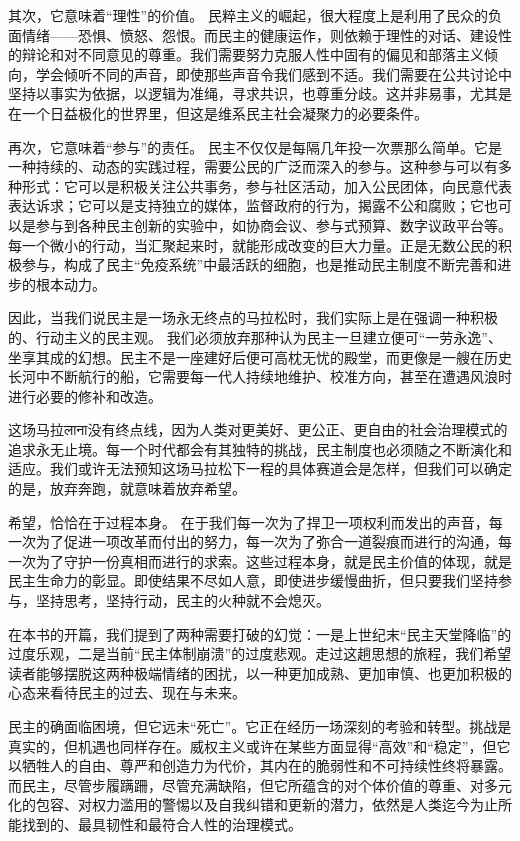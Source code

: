 \documentclass[UTF8, 10pt]{ctexbook}
\begin{document}
其次，它意味着“理性”的价值。 民粹主义的崛起，很大程度上是利用了民众的负面情绪——恐惧、愤怒、怨恨。而民主的健康运作，则依赖于理性的对话、建设性的辩论和对不同意见的尊重。我们需要努力克服人性中固有的偏见和部落主义倾向，学会倾听不同的声音，即使那些声音令我们感到不适。我们需要在公共讨论中坚持以事实为依据，以逻辑为准绳，寻求共识，也尊重分歧。这并非易事，尤其是在一个日益极化的世界里，但这是维系民主社会凝聚力的必要条件。

再次，它意味着“参与”的责任。 民主不仅仅是每隔几年投一次票那么简单。它是一种持续的、动态的实践过程，需要公民的广泛而深入的参与。这种参与可以有多种形式：它可以是积极关注公共事务，参与社区活动，加入公民团体，向民意代表表达诉求；它可以是支持独立的媒体，监督政府的行为，揭露不公和腐败；它也可以是参与到各种民主创新的实验中，如协商会议、参与式预算、数字议政平台等。每一个微小的行动，当汇聚起来时，就能形成改变的巨大力量。正是无数公民的积极参与，构成了民主“免疫系统”中最活跃的细胞，也是推动民主制度不断完善和进步的根本动力。

因此，当我们说民主是一场永无终点的马拉松时，我们实际上是在强调一种积极的、行动主义的民主观。 我们必须放弃那种认为民主一旦建立便可“一劳永逸”、坐享其成的幻想。民主不是一座建好后便可高枕无忧的殿堂，而更像是一艘在历史长河中不断航行的船，它需要每一代人持续地维护、校准方向，甚至在遭遇风浪时进行必要的修补和改造。

这场马拉लाना没有终点线，因为人类对更美好、更公正、更自由的社会治理模式的追求永无止境。每一个时代都会有其独特的挑战，民主制度也必须随之不断演化和适应。我们或许无法预知这场马拉松下一程的具体赛道会是怎样，但我们可以确定的是，放弃奔跑，就意味着放弃希望。

希望，恰恰在于过程本身。 在于我们每一次为了捍卫一项权利而发出的声音，每一次为了促进一项改革而付出的努力，每一次为了弥合一道裂痕而进行的沟通，每一次为了守护一份真相而进行的求索。这些过程本身，就是民主价值的体现，就是民主生命力的彰显。即使结果不尽如人意，即使进步缓慢曲折，但只要我们坚持参与，坚持思考，坚持行动，民主的火种就不会熄灭。

在本书的开篇，我们提到了两种需要打破的幻觉：一是上世纪末“民主天堂降临”的过度乐观，二是当前“民主体制崩溃”的过度悲观。走过这趟思想的旅程，我们希望读者能够摆脱这两种极端情绪的困扰，以一种更加成熟、更加审慎、也更加积极的心态来看待民主的过去、现在与未来。

民主的确面临困境，但它远未“死亡”。它正在经历一场深刻的考验和转型。挑战是真实的，但机遇也同样存在。威权主义或许在某些方面显得“高效”和“稳定”，但它以牺牲人的自由、尊严和创造力为代价，其内在的脆弱性和不可持续性终将暴露。而民主，尽管步履蹒跚，尽管充满缺陷，但它所蕴含的对个体价值的尊重、对多元化的包容、对权力滥用的警惕以及自我纠错和更新的潜力，依然是人类迄今为止所能找到的、最具韧性和最符合人性的治理模式。
\end{document}
